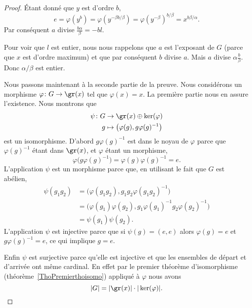 \begin{proof}
	Étant donné que \( y\) est d'ordre \( b\),
	\begin{equation}
		e=\varphi(y^b)=\varphi(y^{-\beta b/\beta})=\varphi(y^{-\beta})^{b/\beta}=x^{b\beta/\alpha}.
	\end{equation}
	Par conséquent \( a\) divise \( \frac{ b\alpha }{ \beta }=-bl\).

	Pour voir que \( l\) est entier, nous nous rappelons que \( a\) est l'exposant de \( G\) (parce que \( x\) est d'ordre maximum) et que par conséquent \( b\) divise \( a\). Mais \( a\) divise \( \alpha\frac{ b }{ \beta }\). Donc \( \alpha/\beta\) est entier.

	Nous passons maintenant à la seconde partie de la preuve. Nous considérons un morphisme \( \varphi\colon G\to \gr(x)\) tel que \( \varphi(x)=x\). La première partie nous en assure l'existence. Nous montrons que
	\begin{equation}
		\begin{aligned}
			\psi\colon G & \to \gr(x)\oplus \ker(\varphi)                  \\
			g            & \mapsto \big( \varphi(g),g\varphi(g)^{-1} \big)
		\end{aligned}
	\end{equation}
	est un isomorphisme. D'abord \( g\varphi(g)^{-1}\) est dans le noyau de \( \varphi\) parce que \( \varphi(g)^{-1}\) étant dans \( \gr(x)\), et \( \varphi\) étant un morphisme,
	\begin{equation}
		\varphi\big( g\varphi(g)^{-1} \big)=\varphi(g)\varphi(g)^{-1}=e.
	\end{equation}
	L'application \( \psi\) est un morphisme parce que, en utilisant le fait que \( G\) est abélien,
	\begin{subequations}
		\begin{align}
			\psi(g_1g_2) & =\big( \varphi(g_1g_2),g_1g_2\varphi(g_1g_2)^{-1} \big)                        \\
			             & =\big( \varphi(g_1)\varphi(g_2),g_1\varphi(g_1)^{-1}g_2\varphi(g_2)^{-1} \big) \\
			             & =\psi(g_1)\psi(g_2).
		\end{align}
	\end{subequations}
	L'application \( \psi\) est injective parce que si \( \psi(g)=(e,e)\) alors \( \varphi(g)=e\) et \( g\varphi(g)^{-1}=e\), ce qui implique \( g=e\).

	Enfin \( \psi\) est surjective parce qu'elle est injective et que les ensembles de départ et d'arrivée ont même cardinal. En effet par le premier théorème d'isomorphisme (théorème~\ref{ThoPremierthoisomo}) appliqué à \( \varphi\) nous avons
	\begin{equation}
		| G |=| \gr(x) |\cdot | \ker(\varphi) |.
	\end{equation}
\end{proof}

